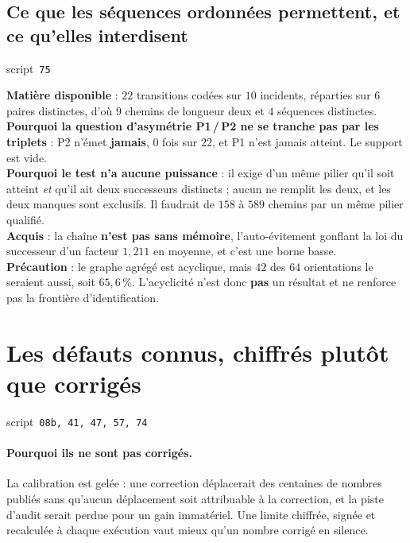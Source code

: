 \documentclass[11pt,a4paper]{article}
\newcommand{\src}[1]{\hfill{\footnotesize\textsf{script~\texttt{#1}}}}
\begin{document}
\subsection*{Ce que les séquences ordonnées permettent, et ce qu'elles interdisent}
\src{\texttt{75}}

\begin{res}
\textbf{Matière disponible} : $22$ transitions codées sur $10$ incidents, réparties sur $6$ paires
distinctes, d'où $9$ chemins de longueur deux et $4$ séquences distinctes.\\
\textbf{Pourquoi la question d'asymétrie P1\,/\,P2 ne se tranche pas par les triplets} : P2
n'émet \textbf{jamais}, $0$ fois sur $22$, et P1 n'est jamais atteint. Le support est vide.\\
\textbf{Pourquoi le test n'a aucune puissance} : il exige d'un même pilier qu'il soit atteint
\emph{et} qu'il ait deux successeurs distincts ; aucun ne remplit les deux, et les deux manques
sont exclusifs. Il faudrait de $158$ à $589$ chemins par un même pilier qualifié.\\
\textbf{Acquis} : la chaîne \textbf{n'est pas sans mémoire}, l'auto-évitement gonflant la loi du
successeur d'un facteur $1{,}211$ en moyenne, et c'est une borne basse.\\
\textbf{Précaution} : le graphe agrégé est acyclique, mais $42$ des $64$ orientations le seraient
aussi, soit $65{,}6\,\%$. L'acyclicité n'est donc \textbf{pas} un résultat et ne renforce pas la
frontière d'identification.
\end{res}

\section{Les défauts connus, chiffrés plutôt que corrigés}
\src{\texttt{08b}, \texttt{41}, \texttt{47}, \texttt{57}, \texttt{74}}

\paragraph{Pourquoi ils ne sont pas corrigés.} La calibration est gelée : une correction
déplacerait des centaines de nombres publiés sans qu'aucun déplacement soit attribuable à la
correction, et la piste d'audit serait perdue pour un gain immatériel. Une limite chiffrée,
signée et recalculée à chaque exécution vaut mieux qu'un nombre corrigé en silence.
\end{document}
